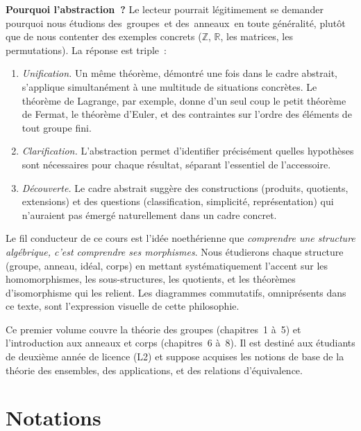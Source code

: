 \documentclass[12pt,a4paper,openany]{book}
\theoremstyle{definition}
\newcommand{\Z}{\mathbb{Z}}
\newcommand{\R}{\mathbb{R}}
\providecommand{\og}{\guillemotleft\,}
\providecommand{\fg}{\,\guillemotright}
\begin{document}
\medskip

\textbf{Pourquoi l'abstraction~?} Le lecteur pourrait légitimement se demander pourquoi
nous étudions des \og groupes\fg{} et des \og anneaux\fg{} en toute généralité, plutôt
que de nous contenter des exemples concrets ($\Z$, $\R$, les matrices, les
permutations). La réponse est triple~:
\begin{enumerate}[label=(\roman*)]
  \item \emph{Unification.} Un même théorème, démontré une fois dans le cadre abstrait,
    s'applique simultanément à une multitude de situations concrètes. Le théorème de
    Lagrange, par exemple, donne d'un seul coup le petit théorème de Fermat, le théorème
    d'Euler, et des contraintes sur l'ordre des éléments de tout groupe fini.
  \item \emph{Clarification.} L'abstraction permet d'identifier précisément quelles
    hypothèses sont nécessaires pour chaque résultat, séparant l'essentiel de
    l'accessoire.
  \item \emph{Découverte.} Le cadre abstrait suggère des constructions (produits,
    quotients, extensions) et des questions (classification, simplicité, représentation)
    qui n'auraient pas émergé naturellement dans un cadre concret.
\end{enumerate}

Le fil conducteur de ce cours est l'idée noethérienne que \emph{comprendre une structure
algébrique, c'est comprendre ses morphismes}. Nous étudierons chaque structure (groupe,
anneau, idéal, corps) en mettant systématiquement l'accent sur les homomorphismes, les
sous-structures, les quotients, et les théorèmes d'isomorphisme qui les relient. Les
diagrammes commutatifs, omniprésents dans ce texte, sont l'expression visuelle de cette
philosophie.

\medskip

Ce premier volume couvre la théorie des groupes (chapitres~1 à~5) et l'introduction aux
anneaux et corps (chapitres~6 à~8). Il est destiné aux étudiants de deuxième année de
licence (L2) et suppose acquises les notions de base de la théorie des ensembles, des
applications, et des relations d'équivalence.

\chapter*{Notations}
\end{document}
